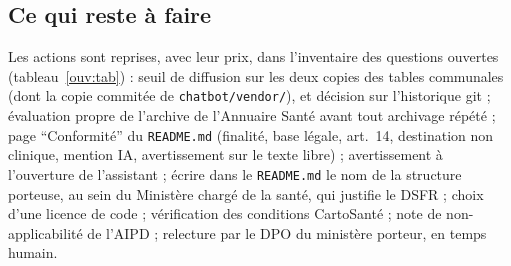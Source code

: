 \subsection{Ce qui reste à faire}\label{conf:reste}

Les actions sont reprises, avec leur prix, dans l'inventaire des questions ouvertes (tableau~\ref{ouv:tab}) :
seuil de diffusion sur les deux copies des tables communales (dont la copie commitée de \texttt{chatbot/\allowbreak{}vendor/\allowbreak{}}), et décision sur l'historique git ;
évaluation propre de l'archive de l'Annuaire Santé avant tout archivage répété ;
page \enquote{Conformité} du \texttt{README.md} (finalité, base légale, art.~14, destination non clinique, mention IA, avertissement sur le texte libre) ;
avertissement à l'ouverture de l'assistant ;
écrire dans le \texttt{README.md} le nom de la structure porteuse, au sein du Ministère chargé de la santé, qui justifie le DSFR ;
choix d'une licence de code ;
vérification des conditions CartoSanté ;
note de non-applicabilité de l'AIPD ;
relecture par le DPO du ministère porteur, en temps humain.
\endgroup
